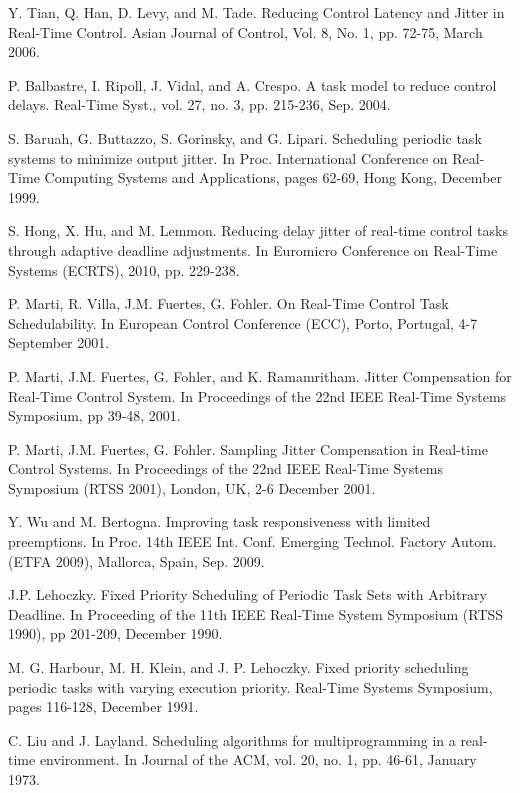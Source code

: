 \documentclass[fleqn]{article}
\begin{document}
\begin{thebibliography}{10}
	Y. Tian, Q. Han, D. Levy, and M. Tade. 
	Reducing Control Latency and Jitter in Real-Time Control.
	Asian Journal of Control, Vol. 8, No. 1, pp. 72-75, March 2006.
	
	P. Balbastre, I. Ripoll, J. Vidal, and A. Crespo.
	A task model to reduce control delays.
	Real-Time Syst., vol. 27, no. 3, pp. 215-236, Sep. 2004.
	
	S. Baruah, G. Buttazzo, S. Gorinsky, and G. Lipari. 
	Scheduling periodic task systems to minimize output jitter. 
	In Proc. International Conference on Real-Time Computing Systems and 
	Applications, pages 62-69, Hong Kong, December 1999.
	
	S. Hong, X. Hu, and M. Lemmon.
	Reducing delay jitter of real-time control tasks through adaptive deadline adjustments.
	In Euromicro Conference on Real-Time Systems (ECRTS), 2010, pp. 229-238.
	
	P. Marti, R. Villa, J.M. Fuertes, G. Fohler. 
	On Real-Time Control Task Schedulability. 
	In European Control Conference (ECC), Porto, Portugal, 4-7 September 2001.
	
	P. Marti, J.M. Fuertes, G. Fohler, and K. Ramamritham. 
	Jitter Compensation for Real-Time Control System. 
	In Proceedings of the 22nd IEEE Real-Time Systems Symposium, pp 39-48, 2001.
	
	P. Marti, J.M. Fuertes, G. Fohler. 
	Sampling Jitter Compensation in Real-time Control Systems. 
	In Proceedings of the 22nd IEEE Real-Time Systems Symposium (RTSS 2001), 
	London, UK, 2-6 December 2001.
	
	Y. Wu and M. Bertogna.
	Improving task responsiveness with limited preemptions.
	In Proc. 14th IEEE Int. Conf. Emerging Technol. Factory Autom. (ETFA 2009), 
	Mallorca, Spain, Sep. 2009.
	
	J.P. Lehoczky.
	Fixed Priority Scheduling of Periodic Task Sets with Arbitrary Deadline.
	In Proceeding of the 11th IEEE Real-Time System Symposium (RTSS 1990), pp 201-209, December 1990.
	
	M. G. Harbour, M. H. Klein, and J. P. Lehoczky. 
	Fixed priority scheduling periodic tasks with varying execution priority.
	Real-Time Systems Symposium, pages 116-128, December 1991.
	
	C. Liu and J. Layland.
	Scheduling algorithms for multiprogramming in a real-time environment.
	In Journal of the ACM, vol. 20, no. 1, pp. 46-61, January 1973.	
	

\end{thebibliography}
\end{document}
